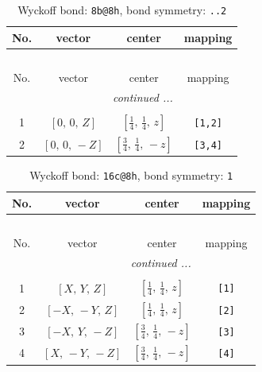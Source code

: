 \documentclass[fleqn,8pt]{jsarticle}
\begin{document}
\renewcommand{\arraystretch}{1.2}
\begin{longtable}{cccc}
\caption{Wyckoff bond: {\tt 8b@8h}, bond symmetry: {\tt ..2}}
 \\
 \hline \hline
No. & vector & center & mapping \\ \hline \endfirsthead

\multicolumn{3}{l}{\tablename\ \thetable{}} \\
 \hline \hline
No. & vector & center & mapping \\ \hline \endhead

 \hline \hline
\multicolumn{3}{r}{\footnotesize\it continued ...} \\ \endfoot

 \hline \hline
\multicolumn{3}{r}{} \\ \endlastfoot

1 & $\left[ 0,\, 0,\, Z \right]$ & $\left[ \frac{1}{4},\, \frac{1}{4},\, z \right]$ & {\tt [1,2]} \\ \hline
2 & $\left[ 0,\, 0,\, - Z \right]$ & $\left[ \frac{3}{4},\, \frac{1}{4},\, - z \right]$ & {\tt [3,4]} \\
\end{longtable}
\renewcommand{\arraystretch}{1.2}
\begin{longtable}{cccc}
\caption{Wyckoff bond: {\tt 16c@8h}, bond symmetry: {\tt 1}}
 \\
 \hline \hline
No. & vector & center & mapping \\ \hline \endfirsthead

\multicolumn{3}{l}{\tablename\ \thetable{}} \\
 \hline \hline
No. & vector & center & mapping \\ \hline \endhead

 \hline \hline
\multicolumn{3}{r}{\footnotesize\it continued ...} \\ \endfoot

 \hline \hline
\multicolumn{3}{r}{} \\ \endlastfoot

1 & $\left[ X,\, Y,\, Z \right]$ & $\left[ \frac{1}{4},\, \frac{1}{4},\, z \right]$ & {\tt [1]} \\ \hline
2 & $\left[ - X,\, - Y,\, Z \right]$ & $\left[ \frac{1}{4},\, \frac{1}{4},\, z \right]$ & {\tt [2]} \\ \hline
3 & $\left[ - X,\, Y,\, - Z \right]$ & $\left[ \frac{3}{4},\, \frac{1}{4},\, - z \right]$ & {\tt [3]} \\ \hline
4 & $\left[ X,\, - Y,\, - Z \right]$ & $\left[ \frac{3}{4},\, \frac{1}{4},\, - z \right]$ & {\tt [4]} \\
\end{longtable}
\end{document}
